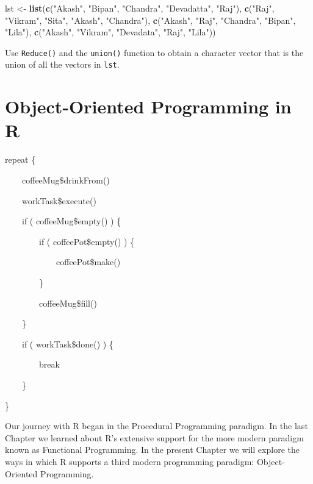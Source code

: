 \documentclass[]{book}
\makeatletter
\newenvironment{Shaded}{\begin{snugshade}}{\end{snugshade}}
\newcommand{\KeywordTok}[1]{\textcolor[rgb]{0.13,0.29,0.53}{\textbf{{#1}}}}
\newcommand{\StringTok}[1]{\textcolor[rgb]{0.31,0.60,0.02}{{#1}}}
\newcommand{\NormalTok}[1]{{#1}}
\newenvironment{kframe}{%
\medskip{}
\setlength{\fboxsep}{.8em}
 \def\at@end@of@kframe{}%
 \ifinner\ifhmode%
  \def\at@end@of@kframe{\end{minipage}}%
  \begin{minipage}{\columnwidth}%
 \fi\fi%
 \def\FrameCommand##1{\hskip\@totalleftmargin \hskip-\fboxsep
 \colorbox{shadecolor}{##1}\hskip-\fboxsep
     \hskip-\linewidth \hskip-\@totalleftmargin \hskip\columnwidth}%
 \MakeFramed {\advance\hsize-\width
   \@totalleftmargin\z@ \linewidth\hsize
   \@setminipage}}%
 {\par\unskip\endMakeFramed%
 \at@end@of@kframe}
\renewenvironment{Shaded}{\begin{kframe}}{\end{kframe}}
\theoremstyle{definition}
\theoremstyle{definition}
\theoremstyle{remark}
\let\BeginKnitrBlock\begin \let\EndKnitrBlock\end
\makeatother
\begin{document}
{\begin{enumerate}
\begin{Shaded}
\begin{Highlighting}[]
   \NormalTok{lst <-}\StringTok{ }\KeywordTok{list}\NormalTok{(}\KeywordTok{c}\NormalTok{(}\StringTok{"Akash"}\NormalTok{, }\StringTok{"Bipan"}\NormalTok{, }\StringTok{"Chandra"}\NormalTok{, }\StringTok{"Devadatta"}\NormalTok{, }\StringTok{"Raj"}\NormalTok{),}
        \KeywordTok{c}\NormalTok{(}\StringTok{"Raj"}\NormalTok{, }\StringTok{"Vikram"}\NormalTok{, }\StringTok{"Sita"}\NormalTok{, }\StringTok{"Akash"}\NormalTok{, }\StringTok{"Chandra"}\NormalTok{),}
        \KeywordTok{c}\NormalTok{(}\StringTok{"Akash"}\NormalTok{, }\StringTok{"Raj"}\NormalTok{, }\StringTok{"Chandra"}\NormalTok{, }\StringTok{"Bipan"}\NormalTok{, }\StringTok{"Lila"}\NormalTok{),}
        \KeywordTok{c}\NormalTok{(}\StringTok{"Akash"}\NormalTok{, }\StringTok{"Vikram"}\NormalTok{, }\StringTok{"Devadata"}\NormalTok{, }\StringTok{"Raj"}\NormalTok{, }\StringTok{"Lila"}\NormalTok{))}
\end{Highlighting}
\end{Shaded}

  Use \texttt{Reduce()} and the \texttt{union()} function to obtain a
  character vector that is the union of all the vectors in \texttt{lst}.
\end{enumerate}

\chapter{Object-Oriented Programming in R}\label{oo}

\BeginKnitrBlock{leadquote}
repeat \{

~~~~coffeeMug\$drinkFrom()

~~~~workTask\$execute()

~~~~if ( coffeeMug\$empty() ) \{

~~~~~~~~if ( coffeePot\$empty() ) \{

~~~~~~~~~~~~coffeePot\$make()

~~~~~~~~\}

~~~~~~~~coffeeMug\$fill()

~~~~\}

~~~~if ( workTask\$done() ) \{

~~~~~~~~break

~~~~\}

\}
\EndKnitrBlock{leadquote}

Our journey with R began in the Procedural Programming paradigm. In the
last Chapter we learned about R's extensive support for the more modern
paradigm known as Functional Programming. In the present Chapter we will
explore the ways in which R supports a third modern programming
paradigm: Object-Oriented Programming.

}
\end{document}
